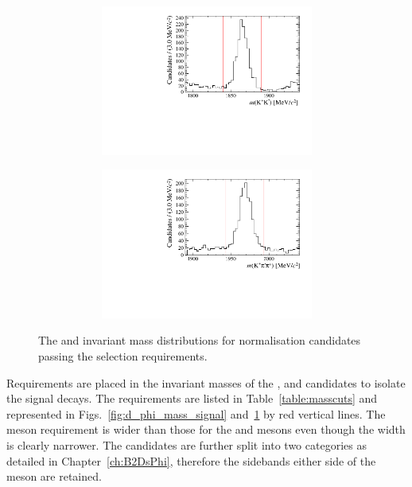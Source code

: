 \begin{figure}[!h]
\begin{subfigure}[t]{1.0\textwidth}
\begin{subfigure}[t]{0.35\textwidth}
        \centering
        \includegraphics[width=1.0\textwidth]{figs/Selection/Phimass_KPiPi_B2DsD0.pdf}
     \end{subfigure}
     \begin{subfigure}[t]{0.35\textwidth}
        \centering
        \includegraphics[width=1.0\textwidth]{figs/Selection/Dmass_KPiPi_B2DsD0.pdf}
     \end{subfigure}
     \caption{\decay{\Dsp}{\Kp\pim\pip}}
   \end{subfigure}
   \caption{The \Dsp and \Dzb invariant mass distributions for normalisation \decay{\Bp}{\Dsp\Dzb} candidates passing the selection requirements.}
   \label{fig:d_phi_mass_normlaisation}   
\end{figure}
Requirements are placed in the invariant masses of the \Dsp, \phiz and \Dzb candidates to isolate the signal decays. The requirements are listed in Table~\ref{table:masscuts} and represented in Figs.~\ref{fig:d_phi_mass_signal} and~\ref{fig:d_phi_mass_normlaisation} by red vertical lines. The \phiz meson requirement is wider than those for the \Dsp and \Dzb mesons even though the width is clearly narrower. The \decay{\Bp}{\Dsp\phiz} candidates are further split into two categories as detailed in Chapter~\ref{ch:B2DsPhi}, therefore the sidebands either side of the \phiz meson are retained.

